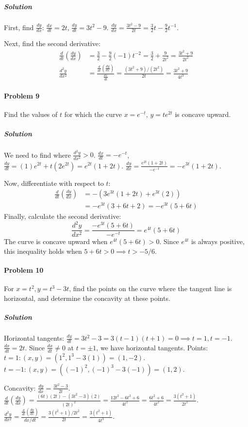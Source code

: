 \documentclass{article}
\begin{document}
\subparagraph{Solution}
First, find $\frac{dy}{dx}$:
$\frac{dx}{dt} = 2t$, $\frac{dy}{dt} = 3t^2 - 9$.
$\frac{dy}{dx} = \frac{3t^2 - 9}{2t} = \frac{3}{2}t - \frac{9}{2}t^{-1}$.

Next, find the second derivative:
\begin{align*}
\frac{d}{dt}\left(\frac{dy}{dx}\right) &= \frac{3}{2} - \frac{9}{2}(-1)t^{-2} = \frac{3}{2} + \frac{9}{2t^2} = \frac{3t^2+9}{2t^2} \\
\frac{d^2y}{dx^2} &= \frac{\frac{d}{dt}\left(\frac{dy}{dx}\right)}{\frac{dx}{dt}} = \frac{(3t^2+9)/(2t^2)}{2t} = \frac{3t^2+9}{4t^3}
\end{align*}

\paragraph{Problem 9}
Find the values of $t$ for which the curve $x = e^{-t}$, $y = t e^{2t}$ is concave upward.

\subparagraph{Solution}
We need to find where $\frac{d^2y}{dx^2} > 0$.
$\frac{dx}{dt} = -e^{-t}$, $\frac{dy}{dt} = (1)e^{2t} + t(2e^{2t}) = e^{2t}(1+2t)$.
$\frac{dy}{dx} = \frac{e^{2t}(1+2t)}{-e^{-t}} = -e^{3t}(1+2t)$.

Now, differentiate with respect to $t$:
\begin{align*}
\frac{d}{dt}\left(\frac{dy}{dx}\right) &= -(3e^{3t}(1+2t) + e^{3t}(2)) \\
&= -e^{3t}(3+6t+2) = -e^{3t}(5+6t)
\end{align*}
Finally, calculate the second derivative:
\[ \frac{d^2y}{dx^2} = \frac{-e^{3t}(5+6t)}{-e^{-t}} = e^{4t}(5+6t) \]
The curve is concave upward when $e^{4t}(5+6t) > 0$. Since $e^{4t}$ is always positive, this inequality holds when $5+6t > 0 \implies t > -5/6$.

\paragraph{Problem 10}
For $x=t^2, y=t^3-3t$, find the points on the curve where the tangent line is horizontal, and determine the concavity at these points.

\subparagraph{Solution}
Horizontal tangents: $\frac{dy}{dt} = 3t^2 - 3 = 3(t-1)(t+1) = 0 \implies t=1, t=-1$.
$\frac{dx}{dt} = 2t$. Since $\frac{dx}{dt} \neq 0$ at $t=\pm 1$, we have horizontal tangents.
Points:
$t=1: (x,y) = (1^2, 1^3-3(1)) = (1, -2)$.
$t=-1: (x,y) = ((-1)^2, (-1)^3-3(-1)) = (1, 2)$.

Concavity:
$\frac{dy}{dx} = \frac{3t^2-3}{2t}$.
$\frac{d}{dt}(\frac{dy}{dx}) = \frac{(6t)(2t) - (3t^2-3)(2)}{(2t)^2} = \frac{12t^2 - 6t^2 + 6}{4t^2} = \frac{6t^2+6}{4t^2} = \frac{3(t^2+1)}{2t^2}$.
$\frac{d^2y}{dx^2} = \frac{\frac{d}{dt}(\frac{dy}{dx})}{dx/dt} = \frac{3(t^2+1)/2t^2}{2t} = \frac{3(t^2+1)}{4t^3}$.
\end{document}
